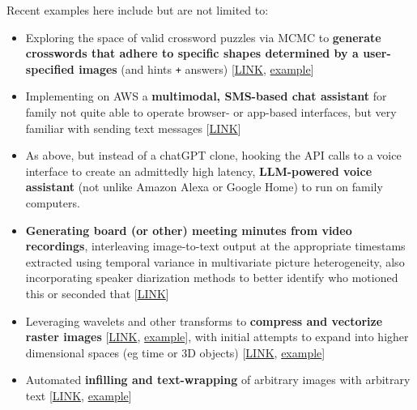 \documentclass[12pt]{article}
\begin{document}
Recent examples here include but are not limited to:

\begin{itemize}[noitemsep]

\item Exploring the space of valid crossword puzzles via MCMC to \textbf{generate crosswords that adhere to specific shapes determined by a user-specified images} (and hints  \texttt{+} answers) [\href{https://github.com/NikVetr/crossword}{LINK}, \href{https://drive.google.com/file/d/1E60FUROV3jh9OK-eIIt5cu\_z9CEeDO66}{example}]

\item Implementing on AWS a \textbf{multimodal, SMS-based chat assistant} for family not quite able to operate browser- or app-based interfaces, but very familiar with sending text messages [\href{https://github.com/NikVetr/minor\_scripts/blob/master/postdoc/email\_gma\_chatGPT-clone.py}{LINK}]

\item As above, but instead of a chatGPT clone, hooking the API calls to a voice interface to create an admittedly high latency, \textbf{LLM-powered voice assistant} (not unlike Amazon Alexa or Google Home) to run on family computers.

\item \textbf{Generating board (or other) meeting minutes from video recordings}, interleaving image-to-text output at the appropriate timestams extracted using temporal variance in multivariate picture heterogeneity, also incorporating speaker diarization methods to better identify who motioned this or seconded that [\href{https://github.com/NikVetr/minor\_scripts/blob/master/postdoc/generate\_meeting\_minutes.py}{LINK}]

\item Leveraging wavelets and other transforms to \textbf{compress and vectorize raster images} [\href{https://github.com/NikVetr/minor\_scripts/blob/c8926965b0c6dd9158351cf5836cbc76261f6830/postdoc/vectorize\_raster\_image.R}{LINK}, \href{https://drive.google.com/file/d/1rrEjdL13qZZIi22Pe5IkbUJKjPmpPpP5}{example}], with initial attempts to expand into higher dimensional spaces (eg time or 3D objects) [\href{https://github.com/NikVetr/minor\_scripts/blob/c8926965b0c6dd9158351cf5836cbc76261f6830/postdoc/interpolate\_signature\_frequency\_series.R}{LINK}, \href{https://drive.google.com/file/d/1IDgm04h0LEZc4IXOPjqBheifsz2Y6ZmW}{example}]

\item Automated \textbf{infilling and text-wrapping} of arbitrary images with arbitrary text [\href{https://github.com/NikVetr/minor\_scripts/blob/c8926965b0c6dd9158351cf5836cbc76261f6830/postdoc/text\_to\_image.R}{LINK}, \href{https://drive.google.com/file/d/1cedbUpq8ArDd4fnjxUZBHlSLuVqsI7UO}{example}]


\end{itemize}
\end{document}
